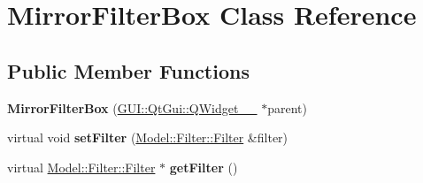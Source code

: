 \hypertarget{classGUI_1_1MirrorFilterBox}{}\section{Mirror\+Filter\+Box Class Reference}
\label{classGUI_1_1MirrorFilterBox}
\subsection*{Public Member Functions}
\begin{DoxyCompactItemize}
\item 
\hypertarget{classGUI_1_1MirrorFilterBox_a4a6750dbc3afd12625a9df12fc012ce5}{}{\bfseries Mirror\+Filter\+Box} (\hyperlink{classGUI_1_1QtGui_1_1QWidget____10}{G\+U\+I\+::\+Qt\+Gui\+::\+Q\+Widget\+\_\+\+\_} $\ast$parent)\label{classGUI_1_1MirrorFilterBox_a4a6750dbc3afd12625a9df12fc012ce5}

\item 
\hypertarget{classGUI_1_1MirrorFilterBox_ad7c0ee00fe3faac7942d75eec2a5342b}{}virtual void {\bfseries set\+Filter} (\hyperlink{classModel_1_1Filter_1_1Filter}{Model\+::\+Filter\+::\+Filter} \&filter)\label{classGUI_1_1MirrorFilterBox_ad7c0ee00fe3faac7942d75eec2a5342b}

\item 
\hypertarget{classGUI_1_1MirrorFilterBox_acef2029a93f4ab3a538cdb643b9c2613}{}virtual \hyperlink{classModel_1_1Filter_1_1Filter}{Model\+::\+Filter\+::\+Filter} $\ast$ {\bfseries get\+Filter} ()\label{classGUI_1_1MirrorFilterBox_acef2029a93f4ab3a538cdb643b9c2613}

\end{DoxyCompactItemize}
